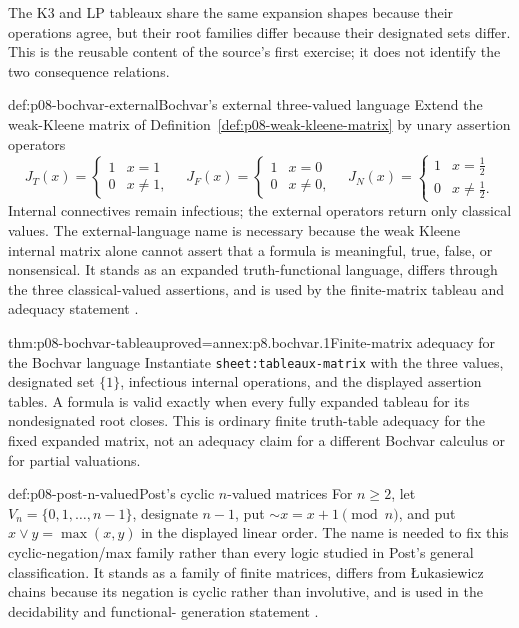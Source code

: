 The K3 and LP tableaux share the same expansion shapes because their
operations agree, but their root families differ because their designated sets
differ.  This is the reusable content of the source's first exercise; it does
not identify the two consequence relations.

\begin{hbdefinition}{def:p08-bochvar-external}{Bochvar's external three-valued language}
Extend the weak-Kleene matrix of Definition~\ref{def:p08-weak-kleene-matrix}
by unary assertion operators
\[
 J_T(x)=\begin{cases}1&x=1\\0&x\ne1,\end{cases}\quad
 J_F(x)=\begin{cases}1&x=0\\0&x\ne0,\end{cases}\quad
 J_N(x)=\begin{cases}1&x=\tfrac12\\0&x\ne\tfrac12.\end{cases}
\]
Internal connectives remain infectious; the external operators return only
classical values. The external-language name is necessary because the weak
Kleene internal matrix alone cannot assert that a formula is meaningful,
true, false, or nonsensical. It stands as an expanded truth-functional
language, differs through the three classical-valued assertions, and is used
by the finite-matrix tableau and adequacy statement
\cite{Bochvar1938English1981}.
\end{hbdefinition}

\begin{hbtheorem}{thm:p08-bochvar-tableau}{proved=annex:p8.bochvar.1}{Finite-matrix adequacy for the Bochvar language}
Instantiate \texttt{sheet:tableaux-matrix} with the three values, designated
set \(\{1\}\), infectious internal operations, and the displayed assertion
tables. A formula is valid exactly when every fully expanded tableau for its
nondesignated root closes. This is ordinary finite truth-table adequacy for the
fixed expanded matrix, not an adequacy claim for a different Bochvar calculus
or for partial valuations.
\end{hbtheorem}

\begin{hbdefinition}{def:p08-post-n-valued}{Post's cyclic \(n\)-valued matrices}
For \(n\ge2\), let \(V_n=\{0,1,\ldots,n-1\}\), designate \(n-1\), put
\(\sim x=x+1\pmod n\), and put \(x\vee y=\max(x,y)\) in the displayed linear
order. The name is needed to fix this cyclic-negation/max family rather than
every logic studied in Post's general classification. It stands as a family of
finite matrices, differs from \L{}ukasiewicz chains because its negation is
cyclic rather than involutive, and is used in the decidability and functional-
generation statement \cite{Post1921}.
\end{hbdefinition}

